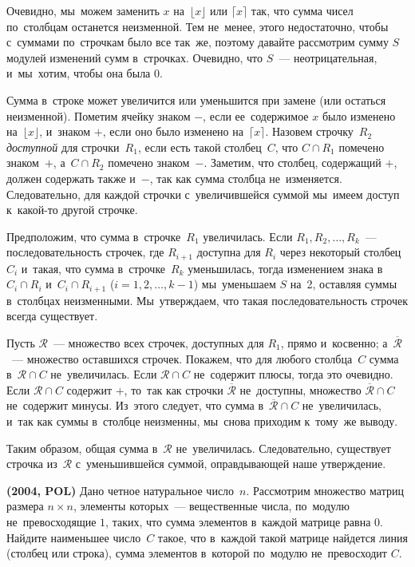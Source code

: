 \ifincludesolutions
Очевидно, мы~можем заменить $x$ на~$\lfloor x \rfloor$ или $\lceil x \rceil$
так, что сумма чисел по~столбцам останется неизменной.
Тем не~менее, этого недостаточно, чтобы с~суммами по~строчкам было все так~же,
поэтому давайте рассмотрим сумму $S$ модулей изменений сумм в~строчках.
Очевидно, что $S$~--- неотрицательная, и~мы~хотим, чтобы она была 0.
\par
Сумма в~строке может увеличится или уменьшится при замене
(или остаться неизменной).
Пометим ячейку знаком $-$, если ее~содержимое $x$ было изменено
на~$\lfloor x \rfloor$, и~знаком $+$, если оно было изменено
на~$\lceil x \rceil$.
Назовем строчку~$R_2$ \emph{доступной} для строчки~$R_1$, если есть такой
столбец~$C$, что $C \cap R_1$ помечено знаком~$+$,
а~$C \cap R_2$ помечено знаком~$-$.
Заметим, что столбец, содержащий $+$, должен содержать также и~$-$, так как
сумма столбца не~изменяется.
Следовательно, для каждой строчки с~увеличившейся суммой мы~имеем доступ
к~какой-то другой строчке.
\par
Предположим, что сумма в~строчке~$R_1$ увеличилась.
Если $R_1, R_2, \ldots, R_k$~--- последовательность строчек, где $R_{i+1}$
доступна для $R_i$ через некоторый столбец~$C_i$ и~такая, что сумма
в~строчке~$R_k$ уменьшилась, тогда изменением знака в~$C_i \cap R_i$
и~$C_i \cap R_{i+1}$ ($i = 1, 2, \ldots, k - 1$) мы~уменьшаем $S$ на~2,
оставляя суммы в~столбцах неизменными.
Мы~утверждаем, что такая последовательность строчек всегда существует.
\par
Пусть $\mathcal{R}$~--- множество всех строчек, доступных для $R_1$, прямо
и~косвенно;
а~$\overline{\mathcal{R}}$~--- множество оставшихся строчек.
Покажем, что для любого столбца~$C$ сумма в~$\mathcal{R} \cap C$
не~увеличилась.
Если $\mathcal{R} \cap C$ не~содержит плюсы, тогда это очевидно.
Если $\mathcal{R} \cap C$ содержит $+$, то~так как строчки
$\overline{\mathcal{R}}$ не~доступны, множество $\overline{\mathcal{R}} \cap C$
не~содержит минусы.
Из~этого следует, что сумма в~$\overline{\mathcal{R}}\cap C$ не~увеличилась,
и~так как суммы в~столбце неизменны, мы~снова приходим к~тому~же выводу.
\par
Таким образом, общая сумма в~$\mathcal{R}$ не~увеличилась.
Следовательно, существует строчка из~$\mathcal{R}$ с~уменьшившейся суммой,
оправдывающей наше утверждение.
\fi %

\begin{problems}

\item\textbf{(2004, POL)}
Дано четное натуральное число~$n$.
Рассмотрим множество матриц размера $n \times n$, элементы которых~---
вещественные числа, по~модулю не~превосходящие $1$, таких, что сумма элементов
в~каждой матрице равна $0$.
Найдите наименьшее число~$C$ такое, что в~каждой такой матрице найдется линия
(столбец или строка), сумма элементов в~которой по~модулю не~превосходит $C$.

\end{problems}

